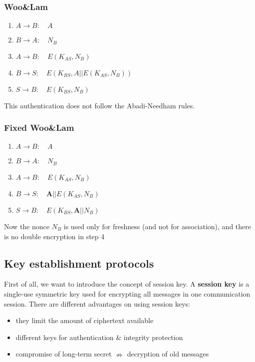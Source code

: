 \subsubsection{Woo\&Lam}
\begin{enumerate}
    \item $A\rightarrow B:\hspace{1em} A$
    \item $B\rightarrow A:\hspace{1em} N_B$
    \item $A\rightarrow B:\hspace{1em} E(K_{AS},N_B)$
    \item $B\rightarrow S:\hspace{1em} E(K_{BS}, A||E(K_{AS},N_B))$
    \item $S\rightarrow B:\hspace{1em} E(K_{BS},N_B)$
\end{enumerate}
This authentication does not follow the Abadi-Needham rules.
\subsubsection{Fixed Woo\&Lam}
\begin{enumerate}
    \item $A\rightarrow B:\hspace{1em} A$
    \item $B\rightarrow A:\hspace{1em} N_B$
    \item $A\rightarrow B:\hspace{1em} E(K_{AS},N_B)$
    \item $B\rightarrow S:\hspace{1em} \textbf{A}||E(K_{AS},N_B)$
    \item $S\rightarrow B:\hspace{1em} E(K_{BS},\boldsymbol{A}||N_B)$
\end{enumerate}
Now the nonce $N_B$ is used only for freshness (and not for association), and there is no double encryption in step 4


\subsection{Key establishment protocols}
First of all, we want to introduce the concept of session key. A \textbf{session key} is a single-use symmetric key used for encrypting all messages in one communication session. There are different advantages on using session keys:
\begin{itemize}
    \item they limit the amount of ciphertext available
    \item different keys for authentication \& integrity protection
    \item compromise of long-term secret $\nRightarrow$ decryption of old messages
\end{itemize}
